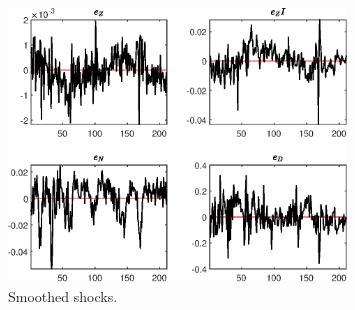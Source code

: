  
\begin{figure}[H]
\centering 
\includegraphics[width=0.80\textwidth]{BRS_extended_fd/graphs/BRS_extended_fd_SmoothedShocks1}
\caption{Smoothed shocks.}\label{Fig:SmoothedShocks:1}
\end{figure}


